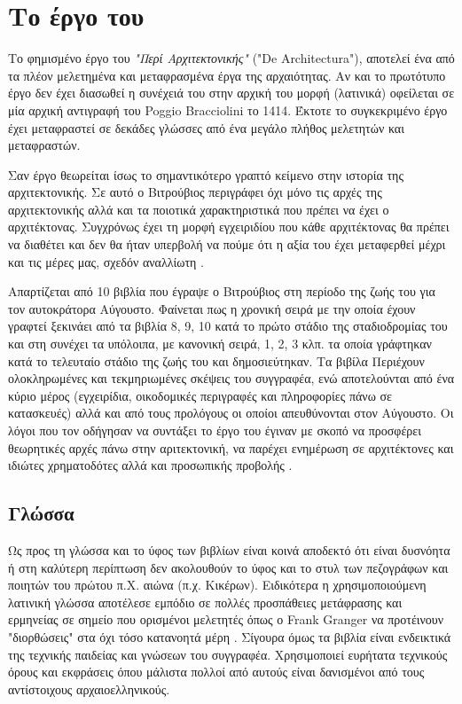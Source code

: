 \section{Το έργο του} 

Το φημισμένο έργο του \emph{"Περί Αρχιτεκτονικής"} ("De Architectura"), αποτελεί ένα από τα πλέον μελετημένα και μεταφρασμένα έργα της αρχαιότητας. Αν και το πρωτότυπο έργο δεν έχει διασωθεί η συνέχειά του στην αρχική του μορφή (λατινικά) οφείλεται σε μία αρχική αντιγραφή του Poggio Bracciolini το 1414. Έκτοτε το συγκεκριμένο έργο έχει μεταφραστεί σε δεκάδες γλώσσες από ένα μεγάλο πλήθος μελετητών και μεταφραστών.

Σαν έργο θεωρείται ίσως το σημαντικότερο γραπτό κείμενο στην ιστορία της αρχιτεκτονικής. Σε αυτό ο Βιτρούβιος περιγράφει όχι μόνο τις αρχές της αρχιτεκτονικής αλλά και τα ποιοτικά χαρακτηριστικά που πρέπει να έχει ο αρχιτέκτονας. Συγχρόνως έχει τη μορφή εγχειριδίου που κάθε αρχιτέκτονας θα πρέπει να διαθέτει και δεν θα ήταν υπερβολή να πούμε ότι η αξία του έχει μεταφερθεί μέχρι και τις μέρες μας, σχεδόν αναλλίωτη \cite[σ. 16-18]{vitruvius-lefas}.

Απαρτίζεται από 10 βιβλία που έγραψε ο Βιτρούβιος στη περίοδο της ζωής του για τον αυτοκράτορα Αύγουστο. Φαίνεται πως η χρονική σειρά με την οποία έχουν γραφτεί ξεκινάει από τα βιβλία 8, 9, 10 κατά το πρώτο στάδιο της σταδιοδρομίας του και στη συνέχει τα υπόλοιπα, με κανονική σειρά, 1, 2, 3 κλπ. τα οποία γράφτηκαν κατά το τελευταίο στάδιο της ζωής του και δημοσιεύτηκαν. Τα βιβίλα Περιέχουν ολοκληρωμένες και τεκμηριωμένες σκέψεις του συγγραφέα, ενώ αποτελούνται από ένα κύριο μέρος (εγχειρίδια, οικοδομικές περιγραφές και πληροφορίες πάνω σε κατασκευές) αλλά και από τους προλόγους οι οποίοι απευθύνονται στον Αύγουστο. Οι λόγοι που τον οδήγησαν να συντάξει το έργο του έγιναν με σκοπό να προσφέρει θεωρητικές αρχές πάνω στην αριτεκτονική, να παρέχει ενημέρωση σε αρχιτέκτονες και ιδιώτες χρηματοδότες αλλά και προσωπικής προβολής \cite{vitruvius-lefas}.

\subsection{Γλώσσα}

Ως προς τη γλώσσα και το ύφος των βιβλίων είναι κοινά αποδεκτό ότι είναι δυσνόητα ή στη καλύτερη περίπτωση δεν ακολουθούν το ύφος και το στυλ των πεζογράφων και ποιητών του πρώτου π.Χ. αιώνα (π.χ. Κικέρων). Ειδικότερα η χρησιμοποιούμενη λατινική γλώσσα αποτέλεσε εμπόδιο σε πολλές προσπάθειες μετάφρασης και ερμηνείας σε σημείο που ορισμένοι μελετητές όπως ο Frank Granger να προτέινουν "διορθώσεις" στα όχι τόσο κατανοητά μέρη  \cite[σ. 19]{vitruvius-lefas}. Σίγουρα όμως τα βιβλία είναι ενδεικτικά της τεχνικής παιδείας και γνώσεων του συγγραφέα. Χρησιμοποιεί ευρήτατα τεχνικούς όρους και εκφράσεις όπου μάλιστα πολλοί από αυτούς είναι δανισμένοι από τους αντίστοιχους αρχαιοελληνικούς.

